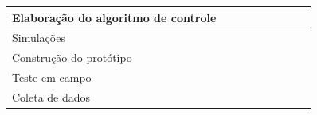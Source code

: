 \begin{table}[h]
\begin{tabular}{|l|l|l|l|l|l|l|l|l|}
Elaboração do algoritmo de controle                &                          &                                                 &                          &                                                 & \cellcolor[HTML]{000000} & \cellcolor[HTML]{000000}{\color[HTML]{000000} } & {\color[HTML]{000000} }                         &                          \\ \hline
Simulações                                         &                          &                                                 &                          &                                                 &                          & \cellcolor[HTML]{000000}{\color[HTML]{000000} } &                                                 &                          \\ \hline
Construção do protótipo                            &                          &                                                 &                          &                                                 &                          & \cellcolor[HTML]{000000}{\color[HTML]{000000} } & \cellcolor[HTML]{000000}{\color[HTML]{000000} } &                          \\ \hline
Teste em campo                                     &                          &                                                 &                          &                                                 &                          &                                                 & \cellcolor[HTML]{000000}{\color[HTML]{000000} } &                          \\ \hline
Coleta de dados                                    &                          &                                                 &                          &                                                 &                          &                                                 &                                                 & \cellcolor[HTML]{000000} \\ \hline
\end{tabular}
\end{table}
